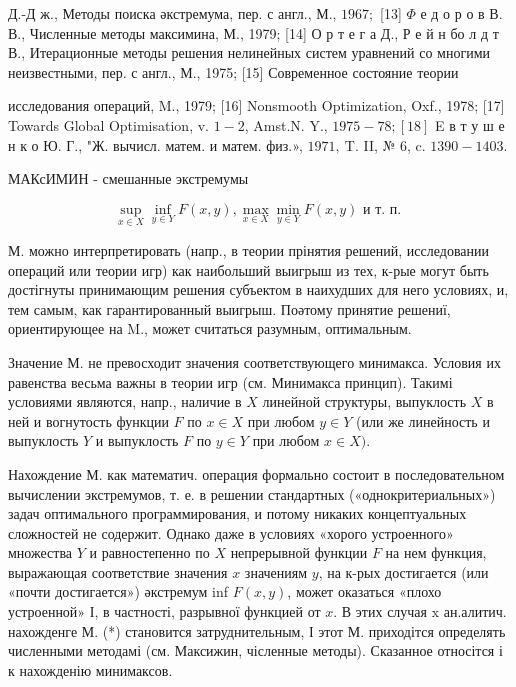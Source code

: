 \documentclass[10pt]{article}
\begin{document}
Д.-Д ж., Методы поиска әкстремума, пер. с англ., М., $1967 ;$ [13] $\Phi$ е д о р о в В. В., Численные методы максимина, М., 1979; [14] О р т е г а Д., Р е й н бо л д т В., Итерационные методы решения нелинейных систем уравнений со многими неизвестными, пер. с англ., М., 1975; [15] Современное состояние теории

исследования операций, M., 1979; [16] Nonsmooth Optimization, Oxf., 1978; [17] Towards Global Optimisation, v. $1-2$, Amst.N. Y., $1975-78 ;[18]$ E в т у ш е н к о Ю. Г., "Ж. вычисл. матем. и матем. физ.», $1971, \mathrm{~T}$. II, № 6, c. $1390-1403$.



МАКсИМИН - смешанные экстремумы



\[

\sup _{x \in X} \inf _{y \in Y} F(x, y), \max _{x \in X} \min _{y \in Y} F(x, y) \text { и т. п. }

\]



М. можно интерпретировать (напр., в теории прінятия решений, исследовании операций или теории игр) как наибольший выигрыш из тех, к-рые могут быть достігнуты принимающим решения субъектом в наихудших для него условиях, и, тем самым, как гарантированный выигрыш. Поәтому принятие решениї, ориентирующее на M., может считаться разумным, оптимальным.



Значение М. не превосходит значения соответствующего минимакса. Условия их равенства весьма важны в теории игр (см. Минимакса принцип). Такимі условиями являются, напр., наличие в $X$ линейной структуры, выпуклость $X$ в ней и вогнутость функции $F$ по $x \in X$ при любом $y \in Y$ (или же линейность и выпуклость $Y$ и выпуклость $F$ по $y \in Y$ при любом $x \in X)$.



Нахождение М. как математич. операция формально состоит в последовательном вычислении экстремумов, т. е. в решении стандартных («однокритериальных») задач оптимального программирования, и потому никаких концептуальных сложностей не содержит. Однако даже в условиях «хорого устроенного» множества $Y$ и равностепенно по $X$ непрерывной функции $F$ на нем функция, выражающая соответствие значения $x$ значениям $y$, на к-рых достигается (или «почти достигается») әкстремум inf $F(x, y)$, может оказаться «плохо устроенной» І, в частності, разрывної функцией от $x$. В этих случая $\mathrm{x}$ ан.алитич. нахожденге М. (*) становится затруднительным, І этот М. приходітся определять численными методамі (см. Максижин, чісленные методы). Сказанное относітся і к нахожденію минимаксов.
\end{document}
